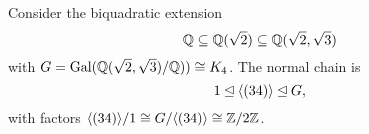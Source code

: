 \begin{example}
    Consider the biquadratic extension
    \[
        \mathbb{{Q}} \subseteq \mathbb{{Q}}(\sqrt{2}) \subseteq \mathbb{{Q}}(\sqrt{2}, \sqrt{3})
    \]
    with $G = \operatorname{Gal}(\mathbb{{Q}}(\sqrt{2}, \sqrt{3})/\mathbb{{Q}})) \cong K_4$. The normal chain is
    \[
        1 \unlhd \langle {(34)} \rangle \unlhd G,
    \]
    with factors $\langle {(34)} \rangle/1 \cong G/\langle {(34)} \rangle \cong \mathbb{{Z}}/{{2}}\mathbb{{Z}}$.
\end{example}
